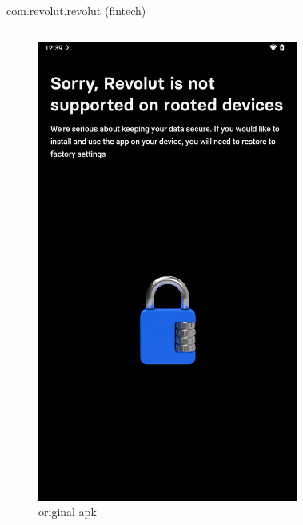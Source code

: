 \documentclass{beamer}
\begin{document}
\begin{frame}[fragile]{com.revolut.revolut (fintech)}
    
    \begin{columns}
        \begin{figure}
            \centering
            \includegraphics[scale=0.07]{revolut.png}
            \caption{original apk}
            \end{figure}
            \begin{figure}

\end{figure}
\end{columns}
\end{frame}
\end{document}
